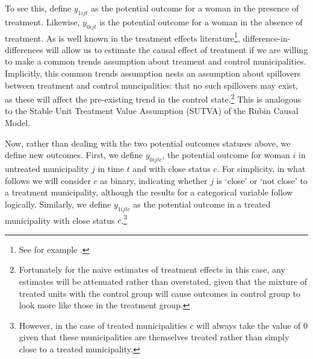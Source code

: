 To see this, define $y_{1ijt}$ as the potential outcome for a woman in the 
presence of treatment.  Likewise, $y_{0ijt}$ is the potential outcome for a 
woman in the absence of treatment.  As is well known in the treatment effects
literature\footnote{See for example \citet{CardKruger1994}.}, difference-in-%
differences will allow us to estimate the causal effect of treatment if we are 
willing to make a common trends assumption about treament and control 
municipalities.  Implicitly, this common trends assumption nests an assumption
about spillovers between treatment and control muncipalities: that no such 
spillovers may exist, as these will affect the pre-existing trend in the control 
state.\footnote{Fortunately for the naive estimates of treatment effects in this 
case, any estimates will be attenuated rather than overstated, given that the 
mixture of treated units with the control group will cause outcomes in control 
group to look more like those in the treatment group.}  This is analogous to the 
Stable Unit Treatment Value Assumption (SUTVA) of the Rubin Causal Model.

Now, rather than dealing with the two potential outcomes statuses above, we
define new outcomes.  First, we define $y_{0ijtc}$, the potential outcome for 
woman $i$ in untreated municipality $j$ in time $t$ and with close status $c$.  
For simplicity, in what follows we will consider $c$ as binary, indicating whether
$j$ is `close' or `not close' to a treatment municipality, although the results
for a categorical variable follow logically.  Similarly, we define $y_{1ijtc}$
as the potential outcome in a treated municipality with close status 
$c$.\footnote{However, in the case of treated municipalities $c$ will always
take the value of 0 given that these municipalities are themselves treated rather
than simply close to a treated municipality.}


